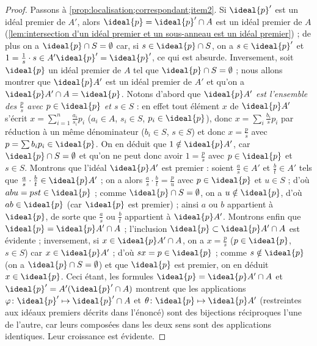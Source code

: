 \documentclass[11pt, useosf,
  title in boldface,
  theorem in new line,
  theorem numbering = section,
  number theorems separately,
]{simplivre}
\begin{document}
\begin{proof}
        Passons à \ref{prop:localisation;correspondant;item2}. Si \( \ideal{p}' \) est un idéal premier de \( A' \), alors \( \ideal{p} = \ideal{p}' \cap A \) est un idéal premier de \( A \) (\cref{lem:intersection d'un idéal premier et un sous-anneau est un idéal premier}) ; de plus on a \( \ideal{p} \cap S = \emptyset \) car, si \( s \in \ideal{p} \cap S \), on a \( s \in \ideal{p}' \) et \( 1 = \frac{1}{s} \cdot s \in A' \ideal{p}' = \ideal{p}' \), ce qui est absurde. Inversement, soit \( \ideal{p} \) un idéal premier de \( A \) tel que \( \ideal{p} \cap S = \emptyset \) ; nous allons montrer que \( \ideal{p} A' \) est un idéal premier de \( A' \) et qu'on a \( \ideal{p} A' \cap A = \ideal{p} \). Notons d'abord que \emph{\( \ideal{p} A' \) est l'ensemble des \( \frac{p}{s} \) avec \( p \in \ideal{p} \) et \( s \in S \)} : en effet tout élément \( x \) de \( \ideal{p} A' \) s'écrit \( x = \sum_{i=1}^n \frac{a_i}{s_i}p_i \) (\( a_i \in A \), \( s_i \in S \), \( p_i \in \ideal{p} \)), donc \( x = \sum_i \frac{b_i}{s} p_i \) par réduction à un même dénominateur (\( b_i \in S \), \( s \in S \)) et donc \( x = \frac{p}{s} \) avec \( p = \sum b_i p_i \in \ideal{p} \). On en déduit que \( 1 \notin \ideal{p} A' \), car \( \ideal{p} \cap S = \emptyset \) et qu'on ne peut donc avoir \( 1 = \frac{p}{s} \) avec \( p \in \ideal{p} \) et \( s \in S \). Montrons que l'idéal \( \ideal{p} A' \) est premier : soient \( \frac{a}{s} \in A' \) et \( \frac{b}{t} \in A' \) tels que \( \frac{a}{s} \cdot \frac{b}{t} \in \ideal{p} A' \) ; on a alors \( \frac{a}{s} \cdot \frac{b}{t} = \frac{p}{u} \) avec \( p \in \ideal{p} \) et \( u \in S \) ; d'où \( abu = pst \in \ideal{p} \) ; comme \( \ideal{p} \cap S = \emptyset \), on a \( u \notin \ideal{p} \), d'où \( ab \in \ideal{p} \) (car \( \ideal{p} \) est premier) ; ainsi \( a \) ou \( b \) appartient à \( \ideal{p} \), de sorte que \( \frac{a}{s} \) ou \( \frac{b}{t} \) appartient à \( \ideal{p} A' \). Montrons enfin que \( \ideal{p} = \ideal{p} A' \cap A \) ; l'inclusion \( \ideal{p} \subset \ideal{p} A' \cap A \) est évidente ; inversement, si \( x \in \ideal{p} A' \cap A \), on a \( x = \frac{p}{s} \) (\( p \in \ideal{p} \), \( s \in S \)) car \( x \in \ideal{p} A' \) ; d'où \( sx = p \in \ideal{p} \) ; comme \( s \notin \ideal{p} \) (on a \( \ideal{p} \cap S = \emptyset \)) et que \( \ideal{p} \) est premier, on en déduit \( x \in \ideal{p} \). Ceci étant, les formules \( \ideal{p} = \ideal{p} A' \cap A \) et \( \ideal{p}' = A'(\ideal{p}' \cap A) \) montrent que les applications \( \varphi \colon \ideal{p}' \mapsto \ideal{p}' \cap A \) et \( \theta \colon \ideal{p} \mapsto \ideal{p} A' \) (restreintes aux idéaux premiers décrits dans l'énoncé) sont des bijections réciproques l'une de l'autre, car leurs composées dans les deux sens sont des applications identiques. Leur croissance est évidente.
    \end{proof}
\end{document}
